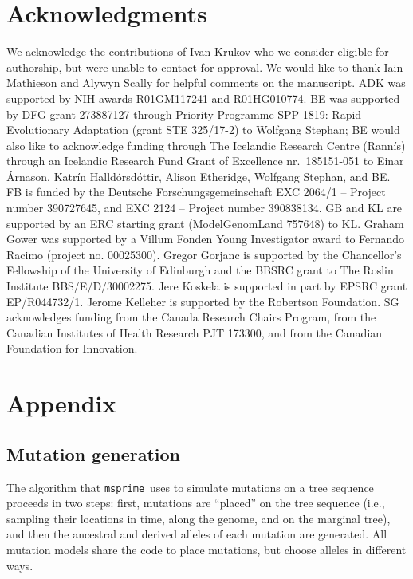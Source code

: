 \documentclass[9pt,twocolumn,twoside,lineno]{gsajnl}
\newcommand{\msprime}[0]{\texttt{msprime}}
\begin{document}
\section*{Acknowledgments}
We acknowledge the contributions of Ivan Krukov who we consider
eligible for authorship, but were unable to contact for approval.
We would like to thank Iain Mathieson and Alywyn Scally for helpful comments
on the manuscript.
ADK was supported by NIH awards R01GM117241 and R01HG010774.
BE was supported by  DFG grant  273887127 through Priority Programme SPP 1819: Rapid Evolutionary Adaptation (grant STE 325/17-2) to Wolfgang Stephan; BE would also like to acknowledge  funding through The Icelandic Research Centre (Rann{\'i}s) through an Icelandic Research Fund Grant of  Excellence nr.\ 185151-051 to Einar \'Arnason,  Katr\'in Halld\'orsd\'ottir,  Alison Etheridge,  Wolfgang Stephan, and BE.
FB is funded by the Deutsche Forschungsgemeinschaft EXC 2064/1 -- Project number 390727645, and EXC 2124 -- Project number 390838134.
GB and KL are supported by an ERC starting grant (ModelGenomLand 757648) to KL.
Graham Gower was supported by a Villum Fonden Young Investigator award to Fernando Racimo (project no. 00025300).
Gregor Gorjanc is supported by the Chancellor's Fellowship of the University of Edinburgh and the BBSRC grant to The Roslin Institute BBS/E/D/30002275.
Jere Koskela is supported in part by EPSRC grant EP/R044732/1.
Jerome Kelleher is supported by the Robertson Foundation.
SG acknowledges funding from the Canada Research Chairs Program, from the Canadian Institutes of Health Research PJT 173300, and from the Canadian Foundation for Innovation.



\setcounter{secnumdepth}{2} %

\appendix
\section*{Appendix}

\subsection*{Mutation generation}
\label{app-mutation-algorithm}

The algorithm that \msprime\ uses to simulate mutations on a tree sequence
proceeds in two steps:
first, mutations are ``placed'' on the tree sequence
(i.e., sampling their locations in time, along the genome, and on the marginal tree),
and then the ancestral and derived alleles of each mutation are generated.
All mutation models share the code to place mutations,
but choose alleles in different ways.
\end{document}
